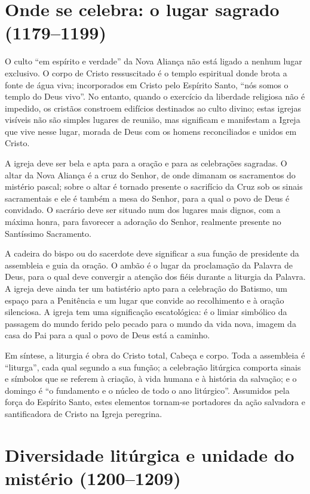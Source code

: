 \section{Onde se celebra: o lugar sagrado (1179--1199)}

O culto ``em espírito e verdade'' da Nova Aliança não está ligado a nenhum lugar exclusivo. O corpo de Cristo ressuscitado é o templo espiritual donde brota a fonte de água viva; incorporados em Cristo pelo Espírito Santo, ``nós somos o templo do Deus vivo''. No entanto, quando o exercício da liberdade religiosa não é impedido, os cristãos constroem edifícios destinados ao culto divino; estas igrejas visíveis não são simples lugares de reunião, mas significam e manifestam a Igreja que vive nesse lugar, morada de Deus com os homens reconciliados e unidos em Cristo.

A igreja deve ser bela e apta para a oração e para as celebrações sagradas. O altar da Nova Aliança é a cruz do Senhor, de onde dimanam os sacramentos do mistério pascal; sobre o altar é tornado presente o sacrifício da Cruz sob os sinais sacramentais e ele é também a mesa do Senhor, para a qual o povo de Deus é convidado. O sacrário deve ser situado num dos lugares mais dignos, com a máxima honra, para favorecer a adoração do Senhor, realmente presente no Santíssimo Sacramento.

A cadeira do bispo ou do sacerdote deve significar a sua função de presidente da assembleia e guia da oração. O ambão é o lugar da proclamação da Palavra de Deus, para o qual deve convergir a atenção dos fiéis durante a liturgia da Palavra. A igreja deve ainda ter um batistério apto para a celebração do Batismo, um espaço para a Penitência e um lugar que convide ao recolhimento e à oração silenciosa. A igreja tem uma significação escatológica: é o limiar simbólico da passagem do mundo ferido pelo pecado para o mundo da vida nova, imagem da casa do Pai para a qual o povo de Deus está a caminho.

Em síntese, a liturgia é obra do Cristo total, Cabeça e corpo. Toda a assembleia é ``liturga'', cada qual segundo a sua função; a celebração litúrgica comporta sinais e símbolos que se referem à criação, à vida humana e à história da salvação; e o domingo é ``o fundamento e o núcleo de todo o ano litúrgico''. Assumidos pela força do Espírito Santo, estes elementos tornam-se portadores da ação salvadora e santificadora de Cristo na Igreja peregrina.

\section{Diversidade litúrgica e unidade do mistério (1200--1209)}

